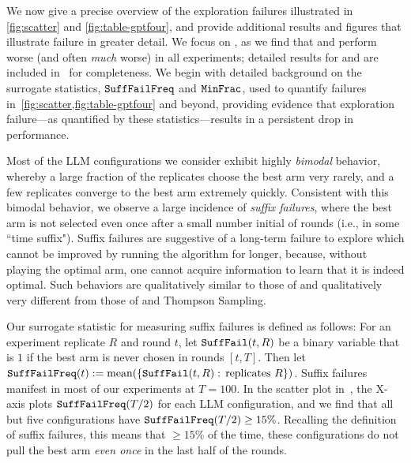 We now give a precise overview of the exploration failures illustrated in
\cref{fig:scatter} and \cref{fig:table-gptfour}, and provide
additional results and figures that illustrate failure in greater detail. We focus 
on \gptfour, as
we find that \gptthree and \llama perform worse (and often \emph{much}
worse) in all experiments; detailed results for \gptthree and \llama
are included in~ for completeness. We begin
with detailed background on the surrogate statistics, $\texttt{SuffFailFreq}$
and $\texttt{MinFrac}$, used to quantify failures
in~\cref{fig:scatter,fig:table-gptfour} and beyond, providing evidence that exploration
failure---as quantified by these statistics---results in a persistent drop in performance.

Most of the LLM configurations we consider exhibit highly
\emph{bimodal} behavior, whereby a large fraction of the replicates
choose the best arm very rarely, and a few
replicates converge to the best arm extremely quickly. Consistent with
this bimodal behavior, we observe a large incidence of \emph{suffix
  failures}, where the best arm is not selected even once after a
small number initial of rounds (i.e., in some ``time suffix"). Suffix failures are suggestive of a long-term failure to explore which cannot be improved by running the algorithm for longer, because, without playing the optimal arm, one cannot acquire information to learn that it is indeed optimal. Such behaviors
are qualitatively similar to those of \greedy
and qualitatively very different from those of \ucb and Thompson Sampling.

Our surrogate statistic for measuring suffix failures is defined as
follows: For an experiment replicate $R$ and round $t$, let
$\texttt{SuffFail}(t,R)$ be a binary variable that is $1$ if the best arm is
never chosen in rounds $[t,T]$. Then let $\texttt{SuffFailFreq}(t) :=
\text{mean}(\left\{\texttt{SuffFail}(t,R):\, \text{replicates $R$}\right\})$. Suffix failures manifest in most of our experiments at $T=100$.
In the scatter plot in~, the X-axis plots $\texttt{SuffFailFreq}(T/2)$ for each
LLM configuration, and we find that all but five configurations have
$\texttt{SuffFailFreq}(T/2) \geq 15\%$. Recalling the definition of suffix
failures, this means that $\geq15\%$ of the time, these configurations do
not pull the best arm \emph{even once} in the last half of the rounds.

